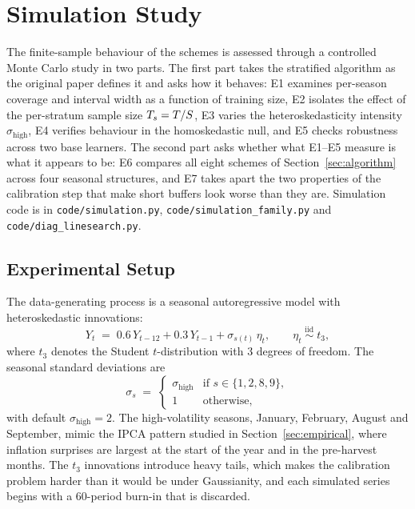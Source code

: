 \section{Simulation Study}
\label{sec:simulations}

The finite-sample behaviour of the schemes is assessed through a
controlled Monte Carlo study in two parts.  The first part takes the
stratified algorithm as the original paper defines it and asks how it
behaves: E1 examines per-season coverage and interval width as a
function of training size, E2 isolates the effect of the per-stratum
sample size $T_s = T/S$, E3 varies the heteroskedasticity intensity
$\sigma_{\mathrm{high}}$, E4 verifies behaviour in the homoskedastic
null, and E5 checks robustness across two base learners.  The second
part asks whether what E1--E5 measure is what it appears to be: E6
compares all eight schemes of Section~\ref{sec:algorithm} across four
seasonal structures, and E7 takes apart the two properties of the
calibration step that make short buffers look worse than they are.
Simulation code is in \texttt{code/simulation.py},
\texttt{code/simulation\_family.py} and
\texttt{code/diag\_linesearch.py}.

\subsection{Experimental Setup}
\label{sec:simulations:setup}

The data-generating process is a seasonal autoregressive model with
heteroskedastic innovations:
\begin{equation}
  \label{eq:dgp_sim}
  Y_t \;=\; 0.6\,Y_{t-12} + 0.3\,Y_{t-1}
       + \sigma_{s(t)}\,\eta_t,
  \qquad
  \eta_t \;\stackrel{\mathrm{iid}}{\sim}\; t_3,
\end{equation}
where $t_3$ denotes the Student $t$-distribution with 3 degrees
of freedom.  The seasonal standard deviations are
\[
  \sigma_s \;=\;
  \begin{cases}
    \sigma_{\mathrm{high}} & \text{if } s \in \{1,2,8,9\}, \\
    1                       & \text{otherwise},
  \end{cases}
\]
with default $\sigma_{\mathrm{high}} = 2$.  The high-volatility
seasons, January, February, August and September, mimic the IPCA
pattern studied in Section~\ref{sec:empirical}, where inflation
surprises are largest at the start of the year and in the pre-harvest
months.  The $t_3$ innovations introduce heavy tails, which makes the
calibration problem harder than it would be under Gaussianity, and
each simulated series begins with a 60-period burn-in that is
discarded.

